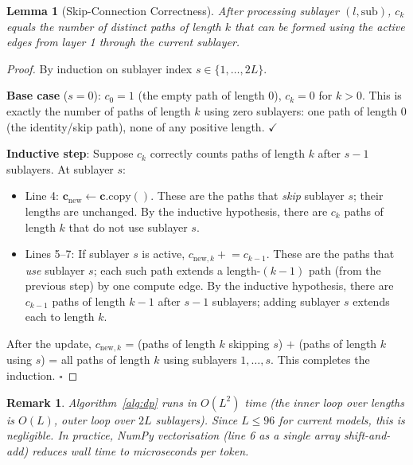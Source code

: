 \documentclass{article}
\newtheorem{lemma}[theorem]{Lemma}
\newtheorem{remark}{Remark}
\begin{document}
\begin{lemma}[Skip-Connection Correctness]
\label{lem:skip}
After processing sublayer $(l, \mathrm{sub})$, $c_k$ equals the number of distinct
paths of length $k$ that can be formed using the active edges from layer 1 through
the current sublayer.
\end{lemma}

\begin{proof}
By induction on sublayer index $s \in \{1, \ldots, 2L\}$.

\textbf{Base case} ($s=0$): $c_0=1$ (the empty path of length 0), $c_k=0$ for $k>0$.
This is exactly the number of paths of length $k$ using zero sublayers: one path of
length 0 (the identity/skip path), none of any positive length. $\checkmark$

\textbf{Inductive step}: Suppose $c_k$ correctly counts paths of length $k$ after
$s-1$ sublayers.  At sublayer $s$:
\begin{itemize}
  \item Line 4: $\mathbf{c}_{\mathrm{new}} \leftarrow \mathbf{c}.\mathrm{copy}()$.
    These are the paths that \emph{skip} sublayer $s$; their lengths are unchanged.
    By the inductive hypothesis, there are $c_k$ paths of length $k$ that do not use sublayer $s$.
  \item Lines 5--7: If sublayer $s$ is active, $c_{\mathrm{new},k} \mathrel{+}= c_{k-1}$.
    These are the paths that \emph{use} sublayer $s$; each such path extends a
    length-$(k-1)$ path (from the previous step) by one compute edge.
    By the inductive hypothesis, there are $c_{k-1}$ paths of length $k-1$ after
    $s-1$ sublayers; adding sublayer $s$ extends each to length $k$.
\end{itemize}
After the update, $c_{\mathrm{new},k}$ = (paths of length $k$ skipping $s$)
$+$ (paths of length $k$ using $s$) = all paths of length $k$ using sublayers
$1,\ldots,s$.  This completes the induction. $\square$
\end{proof}

\begin{remark}
Algorithm~\ref{alg:dp} runs in $O(L^2)$ time (the inner loop over lengths is $O(L)$,
outer loop over $2L$ sublayers).  Since $L \leq 96$ for current models, this is
negligible.  In practice, NumPy vectorisation (line 6 as a single array shift-and-add)
reduces wall time to microseconds per token.
\end{remark}

\end{document}
